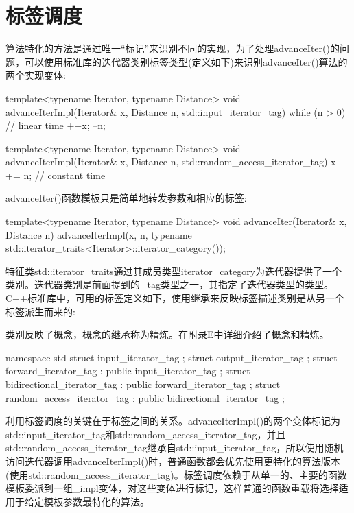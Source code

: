 \section{标签调度}

算法特化的方法是通过唯一“标记”来识别不同的实现，为了处理advanceIter()的问题，可以使用标准库的迭代器类别标签类型(定义如下)来识别advanceIter()算法的两个实现变体:

\begin{cpp}
template<typename Iterator, typename Distance>
void advanceIterImpl(Iterator& x, Distance n, std::input_iterator_tag)
{
	while (n > 0) { // linear time
		++x;
		--n;
	}
}

template<typename Iterator, typename Distance>
void advanceIterImpl(Iterator& x, Distance n,
					std::random_access_iterator_tag) {
	x += n; // constant time
}
\end{cpp}

advanceIter()函数模板只是简单地转发参数和相应的标签:

\begin{cpp}
template<typename Iterator, typename Distance>
void advanceIter(Iterator& x, Distance n)
{
	advanceIterImpl(x, n,
				typename
						std::iterator_traits<Iterator>::iterator_category());
}
\end{cpp}

特征类std::iterator\_traits通过其成员类型iterator\_category为迭代器提供了一个类别。迭代器类别是前面提到的\_tag类型之一，其指定了迭代器类型的类型。C++标准库中，可用的标签定义如下，使用继承来反映标签描述类别是从另一个标签派生而来的:

\begin{notice}
类别反映了概念，概念的继承称为精炼。在附录E中详细介绍了概念和精炼。
\end{notice}

\begin{cpp}
namespace std {
	struct input_iterator_tag { };
	struct output_iterator_tag { };
	struct forward_iterator_tag : public input_iterator_tag { };
	struct bidirectional_iterator_tag : public forward_iterator_tag { };
	struct random_access_iterator_tag : public bidirectional_iterator_tag { };
}
\end{cpp}

利用标签调度的关键在于标签之间的关系。advanceIterImpl()的两个变体标记为std::input\_iterator\_tag和std::random\_access\_iterator\_tag，并且std::random\_access\_iterator\_tag继承自std::input\_iterator\_tag，所以使用随机访问迭代器调用advanceIterImpl()时，普通函数都会优先使用更特化的算法版本(使用std::random\_access\_iterator\_tag)。标签调度依赖于从单一的、主要的函数模板委派到一组\_impl变体，对这些变体进行标记，这样普通的函数重载将选择适用于给定模板参数最特化的算法。

